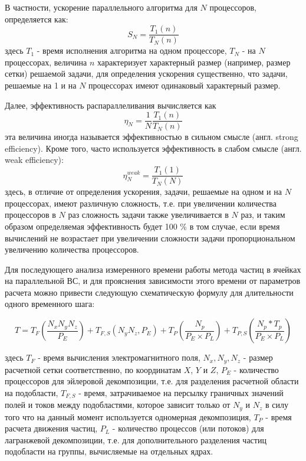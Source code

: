 			В частности, ускорение параллельного алгоритма для $N$ процессоров, определяется как:
			\begin{equation}
			S_N = \frac{T_1(n)}{T_N(n)}
			\end{equation} 
			здесь $T_1$ - время исполнения алгоритма на одном процессоре, $T_N$ - на $N$ процессорах, величина $n$ характеризует характерный размер (например, размер сетки) решаемой задачи, для определения ускорения существенно, что задачи, решаемые на 1 и на $N$ процессорах имеют одинаковый характерный размер.
			
			Далее, эффективность распараллеливания вычисляется как
			\begin{equation}
			\eta_N = \frac{1}{N}\frac{T_1(n)}{T_N(n)}
			\end{equation} 
			эта величина иногда называется эффективностью в сильном смысле (англ. strong efficiency). Кроме того, часто используется эффективность в слабом смысле (англ. weak efficiency):
			\begin{equation}
			\label{weak_eff}
			\eta^{weak}_N = \frac{T_1(1)}{T_N(N)}
			\end{equation}
			здесь, в отличие от определения ускорения, задачи, решаемые на одном и на $N$ процессорах, имеют различную сложность, т.е. при увеличении количества процессоров в $N$ раз сложность задачи также увеличивается в $N$ раз, и таким образом определяемая эффективность будет 100 \% в том случае, если время вычислений не возрастает при увеличении сложности задачи пропорциональном увеличению количества процессоров.   
			
			Для последующего анализа измеренного времени работы метода частиц в ячейках на параллельной ВС, и для прояснения зависимости этого времени от параметров расчета можно привести следующую схематическую формулу для длительности одного временного шага:
			
			\begin{equation}
			\label{PIC-timestep}
			T=T_{F} \left ( \frac{N_x N_y N_z }{P_E}\right )+ T_{F,S}\left (N_y N_z, P_E\right) + T_P\left(\frac{N_p}{P_E\times P_L}\right) +T_{P,S}\left (\frac{N_p*T_p}{P_E\times P_L}\right)
		\end{equation}
			 
		здесь $T_{F}$ - время вычисления электромагнитного поля, $N_x, N_y, N_z$ - размер расчетной сетки соответственно, по координатам $X$, $Y$ и $Z$, $P_E$ - количество процессоров для эйлеровой декомпозиции, т.е. для разделения расчетной области на подобласти, $T_{F,S}$ - время, затрачиваемое на персылку граничных значений полей и токов между подобластями, которое зависит только от $N_y$ и $N_z$ в силу того что на данный момент используется одномерная декомпозиция,  $T_P$ - время расчета движения частиц, $P_L$ - количество процессов (или потоков) для лагранжевой декомпозиции, т.е. для дополнительного разделения частиц подобласти на группы, вычисляемые на отдельных ядрах.
		
